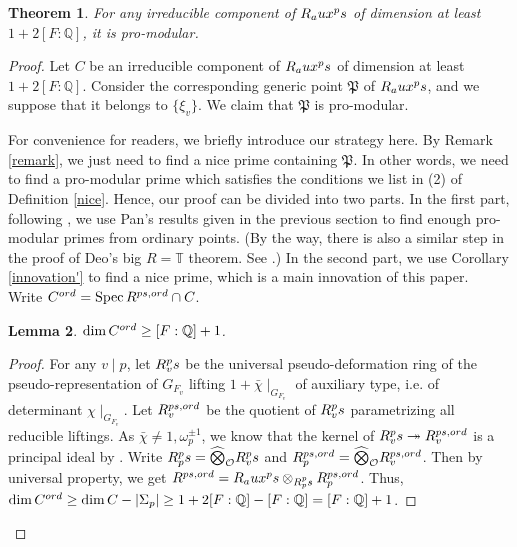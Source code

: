 \documentclass[12pt]{amsart}
\theoremstyle{plain}
\newtheorem{thm}{Theorem}[subsection]
\newtheorem{lem}[thm]{Lemma}
\theoremstyle{definition}
\theoremstyle{remark}
\begin{document}
\begin{thm}\label{pro}
	For any irreducible component of $R_\textnormal{aux}^\textnormal{ps} $ of dimension at least $1+2[F:\mathbb{Q}]$, it is pro-modular.
\end{thm}

\begin{proof}
	Let $C$ be an irreducible component of $R_\textnormal{aux}^\textnormal{ps} $ of dimension at least $1+2[F:\mathbb{Q}]$. Consider the corresponding generic point $\mathfrak{P}$ of $R_\textnormal{aux}^\textnormal{ps} $, and we suppose that it belongs to $\{\xi_v\}$. We claim that $\mathfrak{P}$ is pro-modular.
	
	For convenience for readers, we briefly introduce our strategy here. By Remark \ref{remark}, we just need to find a nice prime containing $\mathfrak{P}$. In other words, we need to find a pro-modular prime which satisfies the conditions we list in (2) of Definition \ref{nice}. Hence, our proof can be divided into two parts. In the first part, following \cite[Section 7]{pan2022fontaine}, we use Pan's results given in the previous section to find enough pro-modular primes from ordinary points. (By the way, there is also a similar step in the proof of Deo's big $R=\mathbb{T}$ theorem. See \cite[Proposition 3.4]{deo2023density}.) In the second part, we use Corollary \ref{innovation'} to find a nice prime, which is a main innovation of this paper.\\
	
    Write $C^{\textnormal{ord}}=\operatorname{Spec} R^{\textnormal{ps,ord}} \cap C$.
	
	\begin{lem}\label{cord}
		$\operatorname{dim} C^{\textnormal{ord}} \ge [F:\mathbb{Q}]+1$.
	\end{lem} 
	
	\begin{proof}
		For any $v \mid p$, let $R_v^\textnormal{ps}$ be the universal pseudo-deformation ring of the pseudo-representation of $G_{F_v} $ lifting $1+\bar{\chi}\mid_{G_{F_v}}$ of auxiliary type, i.e. of determinant $\chi \mid_{G_{F_v}}$. Let $R_v^{\textnormal{ps,ord}}$ be the quotient of $R_v^\textnormal{ps}$ parametrizing all reducible liftings. As $\bar{\chi} \ne 1, \omega_p^{\pm 1}$, we know that the kernel of $ R_v^\textnormal{ps} \twoheadrightarrow R_v^{\textnormal{ps,ord}}$ is a principal ideal by \cite[Corollary B.20]{pavskunas2013image}. Write $R_p^\textnormal{ps}=\widehat{\bigotimes}_{\mathcal{O}} R_v^\textnormal{ps}$ and $R_p^{\textnormal{ps,ord}}=\widehat{\bigotimes}_{\mathcal{O}} R_v^{\textnormal{ps,ord}}$. Then by universal property, we get $R^{\textnormal{ps,ord}} =R_\textnormal{aux}^\textnormal{ps} \otimes_{R_p^\textnormal{ps}} R_p^{\textnormal{ps,ord}}$. Thus, $\operatorname{dim} C^{\textnormal{ord}} \ge \operatorname{dim} C -  |\Sigma_p | \ge 1+ 2[F:\mathbb{Q}]-[F:\mathbb{Q}]=[F:\mathbb{Q}]+1$.
	\end{proof}
	

\end{proof}
\end{document}
